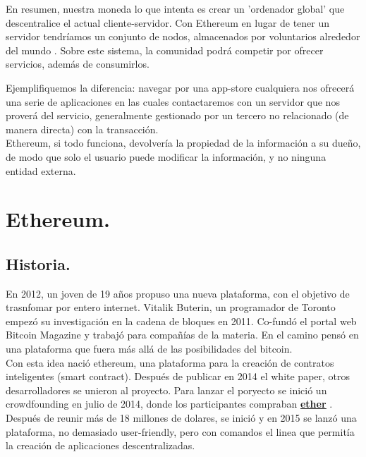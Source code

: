 \documentclass[11pt,a4paper]{article}
\begin{document}

En resumen, nuestra moneda lo que intenta es crear un 'ordenador  global' que descentralice el actual cliente-servidor. Con Ethereum en lugar de tener un servidor tendríamos un conjunto de nodos, almacenados por voluntarios alrededor del mundo . Sobre este sistema, la comunidad podrá competir por ofrecer servicios, además de consumirlos.


Ejemplifiquemos la diferencia: navegar por una app-store cualquiera nos ofrecerá una serie de aplicaciones en las cuales contactaremos con un servidor que nos proverá del servicio, generalmente gestionado por un tercero no relacionado (de manera directa) con la transacción.\\

Ethereum, si todo funciona, devolvería la propiedad de la información a su dueño, de modo que solo el usuario puede modificar la información, y no ninguna entidad externa.\\



\section{Ethereum.\\}


\subsection{Historia.}
En 2012, un joven de 19 años propuso una nueva plataforma, con el objetivo de trasnfomar por entero internet. Vitalik Buterin, un programador de Toronto empezó su investigación en la cadena de bloques en 2011. Co-fundó el portal web Bitcoin Magazine y trabajó para compañías de la materia. En el camino pensó en una plataforma que fuera más allá de las posibilidades del bitcoin.\\

Con esta idea nació ethereum, una plataforma para la creación de contratos inteligentes (smart contract). Después de publicar en 2014 el white paper, otros desarrolladores se unieron al proyecto. Para lanzar el poryecto se inició un crowdfounding en julio de 2014, donde los participantes compraban \hyperref[sec:ether]{\textbf{\underline{ether}}} . Después de reunir más de 18 millones de dolares, se inició y en 2015 se lanzó una plataforma, no demasiado user-friendly, pero con comandos el linea que permitía la creación de aplicaciones descentralizadas.\\
\end{document}
